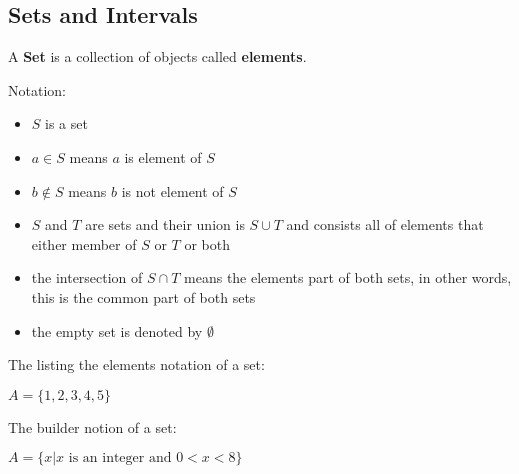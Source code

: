 \subsection{Sets and Intervals}

A \textbf{Set} is a collection of objects called \textbf{elements}.

Notation:
\begin{itemize}
    \item $S$ is a set
    \item $a \in S$ means $a$ is element of $S$
    \item $b \notin S$ means $b$ is not element of $S$
    \item $S$ and $T$ are sets and their union is $S \cup T$ and consists all of
        elements that either member of $S$ or $T$ or both
    \item the intersection of $S \cap T$ means the elements part of both sets, in
        other words, this is the common part of both sets
    \item the empty set is denoted by $\emptyset$
\end{itemize}

The listing the elements notation of a set:

\begin{center}
$A = \{1, 2, 3, 4, 5\}$
\end{center}

The builder notion of a set: 

\begin{center}
$ A = \{x | x \text{ is an integer and } 0 < x < 8 \}$
\end{center}
